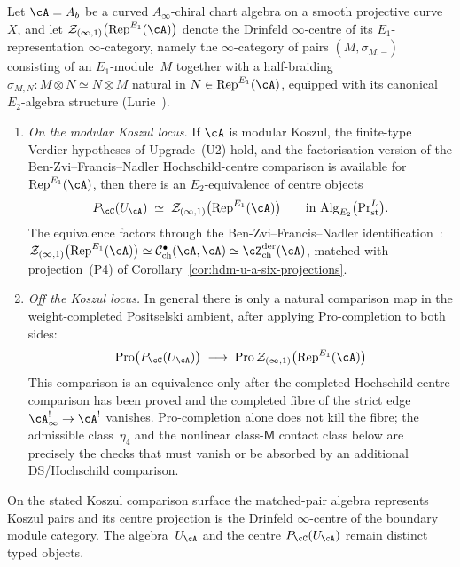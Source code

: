 \begin{theorem}
Let $\cA = A_b$ be a curved $A_\infty$-chiral chart algebra on a
smooth projective curve~$X$, and let
$\mathcal Z_{(\infty,1)}\bigl(\mathrm{Rep}^{E_1}(\cA)\bigr)$ denote
the Drinfeld $\infty$-centre of its $E_1$-representation
$\infty$-category, namely the $\infty$-category of pairs
$(M,\sigma_{M,-})$ consisting of an $E_1$-module~$M$ together with a
half-braiding $\sigma_{M,N}\colon M\otimes N \simeq N\otimes M$
natural in $N\in \mathrm{Rep}^{E_1}(\cA)$, equipped with its canonical
$E_2$-algebra structure (Lurie~\cite[5.3]{HA}).
\begin{enumerate}[label=\textup{(\roman*)}]
\item \emph{On the modular Koszul locus.} If $\cA$ is modular Koszul,
the finite-type Verdier hypotheses of Upgrade~\textup{(U2)} hold, and
the factorisation version of the Ben-Zvi--Francis--Nadler
Hochschild-centre comparison is available for
$\mathrm{Rep}^{E_1}(\cA)$, then there is an $E_2$-equivalence of
centre objects
\begin{equation}\label{eq:hdm-u-a-drinfeld-center-koszul}
P_\cC(U_\cA)
\;\simeq\;
\mathcal Z_{(\infty,1)}\bigl(\mathrm{Rep}^{E_1}(\cA)\bigr)
\qquad \text{in } \mathrm{Alg}_{E_2}\bigl(\mathrm{Pr}^L_{\mathrm{st}}\bigr).
\end{equation}
The equivalence factors through the
Ben-Zvi--Francis--Nadler identification~\cite{BZFN10}:
$\mathcal Z_{(\infty,1)}\bigl(\mathrm{Rep}^{E_1}(\cA)\bigr)
\simeq \mathcal{C}^{\bullet}_{\mathrm{ch}}(\cA,\cA)
\simeq \cZ^{\mathrm{der}}_{\mathrm{ch}}(\cA)$, matched with
projection~\textup{(P4)} of
Corollary~\textup{\ref{cor:hdm-u-a-six-projections}}.
\item \emph{Off the Koszul locus.} In general there is only a natural
comparison map in the weight-completed Positselski ambient,
after applying $\mathrm{Pro}$-completion to both sides:
\begin{equation}\label{eq:hdm-u-a-drinfeld-center-pro}
\mathrm{Pro}\bigl(P_\cC(U_\cA)\bigr)
\;\longrightarrow\;
\mathrm{Pro}\,\mathcal Z_{(\infty,1)}\bigl(\mathrm{Rep}^{E_1}(\cA)\bigr)
\end{equation}
This comparison is an equivalence only after the completed Hochschild-centre
comparison has been proved and the completed fibre of the strict edge
$\cA^{!}_\infty\to\cA^!$ vanishes. Pro-completion alone does not kill
the fibre; the admissible class~$\eta_4$ and the nonlinear
class-$\mathsf M$ contact class below are precisely the checks that
must vanish or be absorbed by an additional DS/Hochschild comparison.
\end{enumerate}
On the stated Koszul comparison surface the matched-pair algebra
represents Koszul pairs and its centre projection is the Drinfeld
$\infty$-centre of the boundary module category. The algebra~$U_\cA$
and the centre $P_\cC(U_\cA)$ remain distinct typed objects.
\end{theorem}

